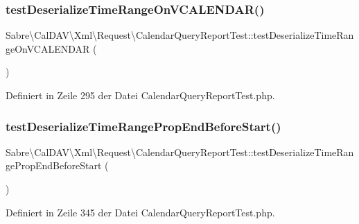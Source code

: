 \subsubsection{\texorpdfstring{test\+Deserialize\+Time\+Range\+On\+V\+C\+A\+L\+E\+N\+D\+A\+R()}{testDeserializeTimeRangeOnVCALENDAR()}}
{\footnotesize\ttfamily Sabre\textbackslash{}\+Cal\+D\+A\+V\textbackslash{}\+Xml\textbackslash{}\+Request\textbackslash{}\+Calendar\+Query\+Report\+Test\+::test\+Deserialize\+Time\+Range\+On\+V\+C\+A\+L\+E\+N\+D\+AR (\begin{DoxyParamCaption}{ }\end{DoxyParamCaption})}



Definiert in Zeile 295 der Datei Calendar\+Query\+Report\+Test.\+php.

\mbox{\label{class_sabre_1_1_cal_d_a_v_1_1_xml_1_1_request_1_1_calendar_query_report_test_ad3b61d7ff0db40c1aaa469df7c338c5f}} 
\subsubsection{\texorpdfstring{test\+Deserialize\+Time\+Range\+Prop\+End\+Before\+Start()}{testDeserializeTimeRangePropEndBeforeStart()}}
{\footnotesize\ttfamily Sabre\textbackslash{}\+Cal\+D\+A\+V\textbackslash{}\+Xml\textbackslash{}\+Request\textbackslash{}\+Calendar\+Query\+Report\+Test\+::test\+Deserialize\+Time\+Range\+Prop\+End\+Before\+Start (\begin{DoxyParamCaption}{ }\end{DoxyParamCaption})}



Definiert in Zeile 345 der Datei Calendar\+Query\+Report\+Test.\+php.



